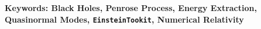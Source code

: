 \documentclass[12pt, twoside]{report}
\begin{document}
\vspace{0.5cm}


\textbf{Keywords: Black Holes, Penrose Process, Energy Extraction, Quasinormal Modes, \texttt{EinsteinTookit}, Numerical Relativity}

\begin{center}
  {\large{}\thispagestyle{empty}}{\large\par}
  \par\end{center}

\newpage

\begin{center}
  {\large{}\thispagestyle{empty}}{\large\par}
  \par\end{center}

\newpage


\thispagestyle{empty}
\listoffigures

\begin{center}
  {\large{}\thispagestyle{empty}}{\large\par}
  \par\end{center}

\newpage

\begin{center}
  {\large{}\thispagestyle{empty}}{\large\par}
  \par\end{center}

\newpage


\listoftables

\begin{center}
  {\large{}\thispagestyle{empty}}{\large\par}
  \par\end{center}

\newpage

\begin{center}
  {\large{}\thispagestyle{empty}}{\large\par}
  \par\end{center}
\end{document}
